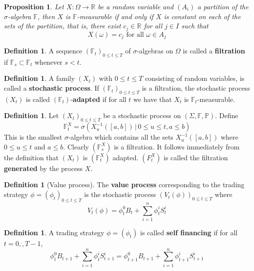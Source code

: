 \documentclass[10pt, oneside, reqno]{amsart}
\theoremstyle{plain}%
\newtheorem{prop}[thm]{Proposition}
\theoremstyle{definition}
\newtheorem{defn}[thm]{Definition}
\theoremstyle{remark}
\newcommand{\given}{ \, | \,}
\newcommand{\R}{\mathbb{R}}
\newcommand{\F}{\mathbb{F}}
\newcommand{\sumni}{\sum_{i=1}^n}
\begin{document}
\begin{prop}Let $X : \Omega \rightarrow \R$ be a random variable and $(A_i)$ a partition of the $\sigma$-algebra $\F$, then $X$ is $\F$-measurable if and only if $X$ is constant on each of the sets of the partition, that is, there exist $c_j \in \R$ for all $j \in I$ such that \[
    X(\omega) = c_j \text{ for all } \omega \in A_j
\]  
\end{prop}

\begin{defn}
    A sequence $(\F_t)_{0 \leq t \leq T}$ of $\sigma$-algebras on $\Omega$ is called a \textbf{filtration} if $\F_s \subset \F_t$ whenever $s < t$.
\end{defn}

\begin{defn}
    A family $(X_t)$ with $0 \leq t \leq T$ consisting of random variables, is called a \textbf{stochastic process}.  If $(\F_t)_{0 \leq t \leq T}$ is a filtration, the stochastic process $(X_t)$ is called $(\F_t)$-\textbf{adapted} if for all $t$ we have that $X_t$ is $\F_t$-measurable.
\end{defn}

\begin{defn}Let $(X_t)_{0 \leq t \leq T}$ be a stochastic process on $(\Sigma, \F, \mathbb{P})$.  Define\[
    \F^X_t = \sigma \left(X^{-1}_u ([a,b]) \given 0 \leq u \leq t, a \leq b \right)
\]
This is the smallest $\sigma$-algebra which contains all the sets $X^{-1}_u([a,b])$ where $0 \leq u \leq t$ and $a \leq b$.  Clearly $(\F^X_s)$ is a filtration.  It follows immediately from the definition that $(X_t)$ is $(\F^X_t)$ adapted.  $(F^X_t)$ is called the filtration \textbf{generated} by the process $X$.
    
\end{defn}


\begin{defn}[Value process]
    The \textbf{value process} corresponding to the trading strategy $\phi = (\phi_t)_{0 \leq t \leq T}$ is the stochastic process $(V_t(\phi))_{0 \leq t \leq T}$ where \[
        V_t(\phi) = \phi^0_t B_t + \sumni \phi^i_t S_t^i
    \]
\end{defn}

\begin{defn}
    A trading strategy $\phi = (\phi_t)$ is called \textbf{self financing} if for all $t = 0,\dot,T-1$,\[
        \phi^0_t B_{t+1} + \sumni \phi^i_t S^i_{t+1} = \phi^0_{t+1} B_{t+1} + \sumni \phi^i_{t+1} S^i_{t+1}
    \]
\end{defn}
\end{document}
